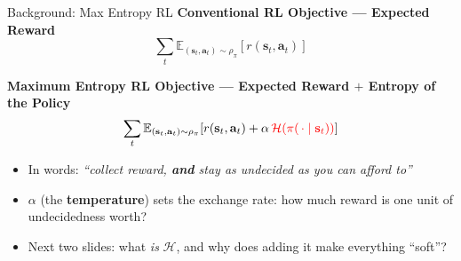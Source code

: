\begin{frame}{Background: Max Entropy RL}
\textbf{Conventional RL Objective --- Expected Reward}
\[
\sum_{t} \mathbb{E}_{(\mathbf{s}_t, \mathbf{a}_t) \sim \rho_\pi}\!\left[ r(\mathbf{s}_t, \mathbf{a}_t) \right]
\]

\textbf{Maximum Entropy RL Objective --- Expected Reward $+$ Entropy of the Policy}
\[
\sum_{t} \mathbb{E}_{(\mathbf{s}_t, \mathbf{a}_t) \sim \rho_\pi}\!\left[ r(\mathbf{s}_t, \mathbf{a}_t) + \alpha\, \textcolor{red}{\mathcal{H}(\pi(\,\cdot \mid \mathbf{s}_t))} \right]
\]
\vspace{0.3em}
\begin{itemize}
    \item In words: \emph{``collect reward, \textbf{and} stay as undecided as you can afford to''}
    \item $\alpha$ (the \textbf{temperature}) sets the exchange rate: how much reward is one unit of undecidedness worth?
    \item[$\Rightarrow$] Next two slides: what \emph{is} $\mathcal{H}$, and why does adding it make everything ``soft''?
\end{itemize}
\end{frame}

